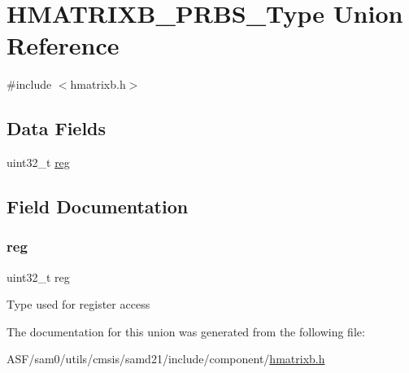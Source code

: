 \hypertarget{union_h_m_a_t_r_i_x_b___p_r_b_s___type}{}\section{H\+M\+A\+T\+R\+I\+X\+B\+\_\+\+P\+R\+B\+S\+\_\+\+Type Union Reference}
\label{union_h_m_a_t_r_i_x_b___p_r_b_s___type}


{\ttfamily \#include $<$hmatrixb.\+h$>$}

\subsection*{Data Fields}
\begin{DoxyCompactItemize}
\item 
uint32\+\_\+t \mbox{\hyperlink{union_h_m_a_t_r_i_x_b___p_r_b_s___type_a6b91636401516a477989a336376d7b40}{reg}}
\end{DoxyCompactItemize}


\subsection{Field Documentation}
\mbox{\label{union_h_m_a_t_r_i_x_b___p_r_b_s___type_a6b91636401516a477989a336376d7b40}} 
\subsubsection{\texorpdfstring{reg}{reg}}
{\footnotesize\ttfamily uint32\+\_\+t reg}

Type used for register access 

The documentation for this union was generated from the following file\+:\begin{DoxyCompactItemize}
\item 
A\+S\+F/sam0/utils/cmsis/samd21/include/component/\mbox{\hyperlink{hmatrixb_8h}{hmatrixb.\+h}}\end{DoxyCompactItemize}
